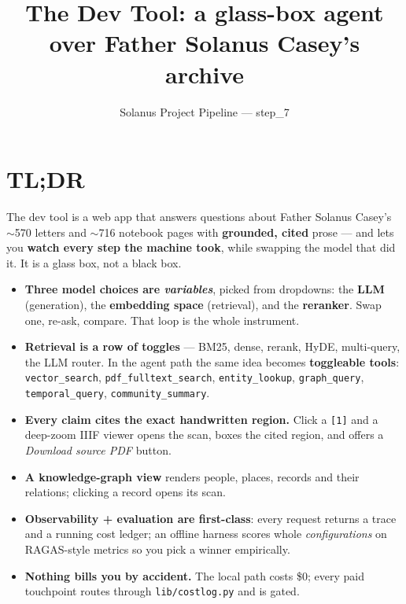 \documentclass[11pt]{article}
\title{The Dev Tool: a glass-box agent over Father Solanus Casey's archive}
\author{Solanus Project Pipeline --- step\_7}
\date{}
\newcommand{\code}[1]{\texttt{#1}}
\begin{document}
\maketitle
\tableofcontents
\bigskip

\section{TL;DR}

\begin{ideabox}
The dev tool is a web app that answers questions about Father Solanus Casey's
$\sim$570 letters and $\sim$716 notebook pages with \textbf{grounded, cited}
prose --- and lets you \textbf{watch every step the machine took}, while
swapping the model that did it. It is a glass box, not a black box.
\end{ideabox}

\begin{itemize}[leftmargin=1.4em]
  \item \textbf{Three model choices are \emph{variables}}, picked from dropdowns:
        the \textbf{LLM} (generation), the \textbf{embedding space} (retrieval),
        and the \textbf{reranker}. Swap one, re-ask, compare. That loop is the
        whole instrument.
  \item \textbf{Retrieval is a row of toggles} --- BM25, dense, rerank, HyDE,
        multi-query, the LLM router. In the agent path the same idea becomes
        \textbf{toggleable tools}: \code{vector\_search}, \code{pdf\_fulltext\_search},
        \code{entity\_lookup}, \code{graph\_query}, \code{temporal\_query},
        \code{community\_summary}.
  \item \textbf{Every claim cites the exact handwritten region.} Click a
        \texttt{[1]} and a deep-zoom IIIF viewer opens the scan, boxes the cited
        region, and offers a \emph{Download source PDF} button.
  \item \textbf{A knowledge-graph view} renders people, places, records and their
        relations; clicking a record opens its scan.
  \item \textbf{Observability + evaluation are first-class}: every request
        returns a trace and a running cost ledger; an offline harness scores
        whole \emph{configurations} on RAGAS-style metrics so you pick a winner
        empirically.
  \item \textbf{Nothing bills you by accident.} The local path costs \$0; every
        paid touchpoint routes through \code{lib/costlog.py} and is gated.
\end{itemize}
\end{document}
